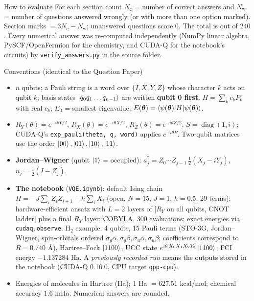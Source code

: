 \documentclass[11pt,a4paper]{article}
\begin{document}
\begin{infobox}{How to evaluate}
For each section count $N_{\mathrm c}$ = number of correct answers and $N_{\mathrm w}$ = number of questions answered wrongly (or with more than one option marked). Section marks $= 3N_{\mathrm c} - N_{\mathrm w}$; unanswered questions score $0$. The total is out of $240$.
Every numerical answer was re-computed independently (NumPy linear algebra, PySCF/OpenFermion for the chemistry, and CUDA-Q for the notebook's circuits) by
\texttt{verify\_answers.py} in the source folder.
\end{infobox}
\begin{infobox}{Conventions (identical to the Question Paper)}

\begin{itemize}[leftmargin=1.2em, itemsep=1pt, topsep=2pt]
\item $n$ qubits; a Pauli string is a word over $\{I, X, Y, Z\}$ whose character $k$ acts on qubit $k$; basis states $\ket{q_0q_1\dots q_{n-1}}$ are written
      \textbf{qubit 0 first}. $H = \sum_kc_kP_k$ with real $c_k$; $E_0$ = smallest eigenvalue; $E(\boldsymbol\theta) = \braket{\psi(\boldsymbol\theta)|H|\psi(\boldsymbol\theta)}$.
\item $R_Y(\theta) = e^{-i\theta Y/2}$, $R_X(\theta) = e^{-i\theta X/2}$, $R_Z(\theta) = e^{-i\theta Z/2}$, $S = \operatorname{diag}(1, i)$; CUDA-Q's \texttt{exp\_pauli(theta, q, word)} applies $e^{+i\theta P}$.
      Two-qubit matrices use the order $\ket{00}, \ket{01}, \ket{10}, \ket{11}$.
\item \textbf{Jordan--Wigner} (qubit $\ket1$ = occupied): $a_j^\dagger = Z_0\cdots Z_{j-1}\,\tfrac12(X_j - iY_j)$, $n_j = \tfrac12(I - Z_j)$.
\item \textbf{The notebook} (\texttt{VQE.ipynb}): default Ising chain $H = -J\sum_{i}Z_iZ_{i+1} - h\sum_iX_i$ (open, $N = 15$, $J = 1$, $h = 0.5$, 29 terms);
      hardware-efficient ansatz with $L = 2$ layers of [$R_Y$ on all qubits, CNOT ladder] plus a final $R_Y$ layer; COBYLA, 300 evaluations; exact
      energies via \texttt{cudaq.observe}. H$_2$ example: 4 qubits, 15 Pauli terms (STO-3G, Jordan--Wigner, spin-orbitals ordered $\sigma_g\alpha, \sigma_g\beta, \sigma_u\alpha, \sigma_u\beta$;
      coefficients correspond to $R = 0.740$ \AA), Hartree--Fock $\ket{1100}$, UCC state $e^{i\theta\,X_0X_1X_2Y_3}\ket{1100}$, FCI energy $-1.137284$ Ha.
      A \emph{previously recorded run} means the outputs stored in the notebook (CUDA-Q 0.16.0, CPU target \texttt{qpp-cpu}).
\item Energies of molecules in Hartree (Ha); 1 Ha $= 627.51$ kcal/mol; chemical accuracy $1.6$ mHa. Numerical answers are rounded.
\end{itemize}
\end{infobox}
\newpage
\end{document}
